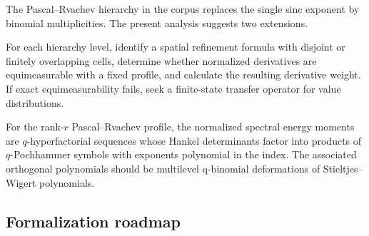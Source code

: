 \documentclass[11pt,oneside]{article}
\theoremstyle{definition}
\theoremstyle{remark}
\begin{document}
The Pascal--Rvachev hierarchy in the corpus replaces the single sinc exponent by binomial
multiplicities.  The present analysis suggests two extensions.

\begin{problem}
For each hierarchy level, identify a spatial refinement formula with disjoint or finitely
overlapping cells, determine whether normalized derivatives are equimeasurable with a fixed
profile, and calculate the resulting derivative weight.  If exact equimeasurability fails,
seek a finite-state transfer operator for value distributions.
\end{problem}

\begin{conjecture}
For the rank-$r$ Pascal--Rvachev profile, the normalized spectral energy moments are
$q$-hyperfactorial sequences whose Hankel determinants factor into products of
$q$-Pochhammer symbols with exponents polynomial in the index.  The associated orthogonal
polynomials should be multilevel q-binomial deformations of Stieltjes--Wigert polynomials.
\end{conjecture}

\subsection{Formalization roadmap}
\end{document}

